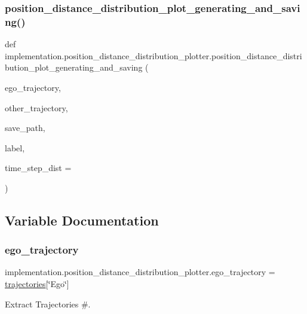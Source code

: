 \subsubsection{\texorpdfstring{position\+\_\+distance\+\_\+distribution\+\_\+plot\+\_\+generating\+\_\+and\+\_\+saving()}{position\_distance\_distribution\_plot\_generating\_and\_saving()}}
{\footnotesize\ttfamily def implementation.\+position\+\_\+distance\+\_\+distribution\+\_\+plotter.\+position\+\_\+distance\+\_\+distribution\+\_\+plot\+\_\+generating\+\_\+and\+\_\+saving (\begin{DoxyParamCaption}\item[{}]{ego\+\_\+trajectory,  }\item[{}]{other\+\_\+trajectory,  }\item[{}]{save\+\_\+path,  }\item[{}]{label,  }\item[{}]{time\+\_\+step\+\_\+dist = {} }\end{DoxyParamCaption})}



\subsection{Variable Documentation}
\mbox{\label{namespaceimplementation_1_1position__distance__distribution__plotter_a89ec6d992eb771c7bae52ca515ad503a}} 
\subsubsection{\texorpdfstring{ego\+\_\+trajectory}{ego\_trajectory}}
{\footnotesize\ttfamily implementation.\+position\+\_\+distance\+\_\+distribution\+\_\+plotter.\+ego\+\_\+trajectory = \hyperlink{namespaceimplementation_1_1position__distance__distribution__plotter_a147220372f66407d092186f0928e5000}{trajectories}\mbox{[}\char`\"{}Ego\char`\"{}\mbox{]}}



Extract Trajectories \#. 

